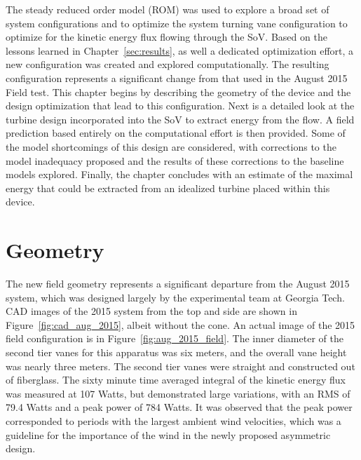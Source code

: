 \label{sec:field}

The steady reduced order model (ROM) was used to explore a broad set of
system configurations and to optimize the system turning vane
configuration to optimize for the kinetic energy flux flowing through
the SoV. Based on the lessons learned in Chapter~\ref{sec:results}, as
well a dedicated optimization effort, a new configuration was created
and explored computationally. The resulting configuration represents a
significant change from that used in the August 2015 Field test. This
chapter begins by describing the geometry of the device and the design
optimization that lead to this configuration. Next is a detailed look
at the turbine design incorporated into the SoV to extract energy from
the flow. A field prediction based entirely on the computational effort is
then provided. Some of the model shortcomings of this design are
considered, with corrections to the model inadequacy proposed and the
results of these corrections to the baseline models explored. Finally,
the chapter concludes with an estimate of the maximal energy that could
be extracted from an idealized turbine placed within this device.   

\section{Geometry}

The new field geometry represents a significant departure from
the August 2015 system, which was designed largely by the experimental
team at Georgia Tech. CAD images of the 2015 system from the top and
side are shown in Figure~\ref{fig:cad_aug_2015}, albeit without the
cone. An actual image of the 2015 field configuration is in
Figure~\ref{fig:aug_2015_field}. The inner diameter of the second tier
vanes for this apparatus was six meters, and the overall vane height was
nearly three meters. The second tier vanes were straight and constructed
out of fiberglass. The sixty minute time averaged integral of the
kinetic energy flux was measured at 107 Watts, but demonstrated large
variations, with an RMS of 79.4 Watts and a peak power of 784 Watts. It
was observed that the peak power corresponded to periods with the
largest ambient wind velocities, which was a guideline for the
importance of the wind in the newly proposed asymmetric design. 

%
%
% 


